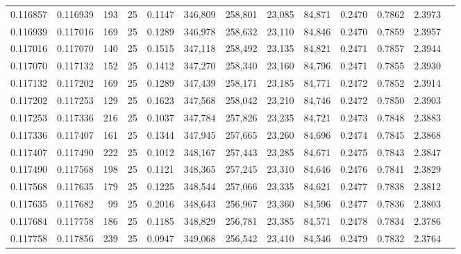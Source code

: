 \begin{tabular}{rrrrrrrrrrrrr}
0.116857 & 0.116939 &   193 &  25 &                                     0.1147 & 346,809 & 258,801 &  23,085 &  84,871 & 0.2470 & 0.7862 & 2.3973 \\
0.116939 & 0.117016 &   169 &  25 &                                     0.1289 & 346,978 & 258,632 &  23,110 &  84,846 & 0.2470 & 0.7859 & 2.3957 \\
0.117016 & 0.117070 &   140 &  25 &                                     0.1515 & 347,118 & 258,492 &  23,135 &  84,821 & 0.2471 & 0.7857 & 2.3944 \\
0.117070 & 0.117132 &   152 &  25 &                                     0.1412 & 347,270 & 258,340 &  23,160 &  84,796 & 0.2471 & 0.7855 & 2.3930 \\
0.117132 & 0.117202 &   169 &  25 &                                     0.1289 & 347,439 & 258,171 &  23,185 &  84,771 & 0.2472 & 0.7852 & 2.3914 \\
0.117202 & 0.117253 &   129 &  25 &                                     0.1623 & 347,568 & 258,042 &  23,210 &  84,746 & 0.2472 & 0.7850 & 2.3903 \\
0.117253 & 0.117336 &   216 &  25 &                                     0.1037 & 347,784 & 257,826 &  23,235 &  84,721 & 0.2473 & 0.7848 & 2.3883 \\
0.117336 & 0.117407 &   161 &  25 &                                     0.1344 & 347,945 & 257,665 &  23,260 &  84,696 & 0.2474 & 0.7845 & 2.3868 \\
0.117407 & 0.117490 &   222 &  25 &                                     0.1012 & 348,167 & 257,443 &  23,285 &  84,671 & 0.2475 & 0.7843 & 2.3847 \\
0.117490 & 0.117568 &   198 &  25 &                                     0.1121 & 348,365 & 257,245 &  23,310 &  84,646 & 0.2476 & 0.7841 & 2.3829 \\
0.117568 & 0.117635 &   179 &  25 &                                     0.1225 & 348,544 & 257,066 &  23,335 &  84,621 & 0.2477 & 0.7838 & 2.3812 \\
0.117635 & 0.117682 &    99 &  25 &                                     0.2016 & 348,643 & 256,967 &  23,360 &  84,596 & 0.2477 & 0.7836 & 2.3803 \\
0.117684 & 0.117758 &   186 &  25 &                                     0.1185 & 348,829 & 256,781 &  23,385 &  84,571 & 0.2478 & 0.7834 & 2.3786 \\
0.117758 & 0.117856 &   239 &  25 &                                     0.0947 & 349,068 & 256,542 &  23,410 &  84,546 & 0.2479 & 0.7832 & 2.3764 \\

\end{tabular}
